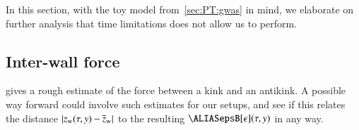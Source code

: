 




In this section, with the toy model from~\cref{sec:PT:gwas} in mind, we elaborate on further analysis that time limitations does not allow us to perform.













\subsection{Inter-wall force}\label{sec:whatif:cont:interwall}
 gives a rough estimate of the force between a kink and an antikink. A possible way forward could involve such estimates for our setups, and see if this relates the distance $\abs{z_\mathrm{w}(\tau,y) - \overline{z}_\mathrm{w}}$ to the resulting $\epsB[\epsilon](\tau, y)$ in any way. 


